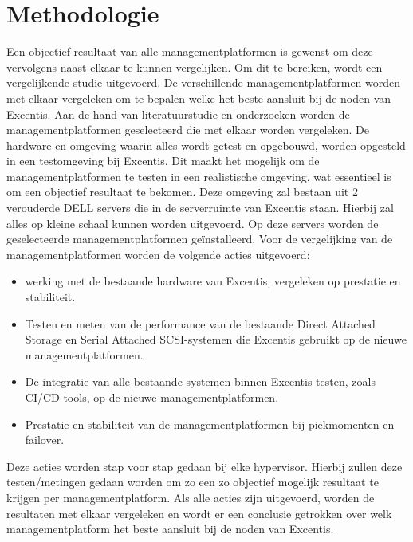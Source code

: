 

\section{Methodologie}%
\label{sec:methodologie}
Een objectief resultaat van alle managementplatformen is gewenst om deze vervolgens naast elkaar te kunnen vergelijken. Om dit te bereiken, wordt een vergelijkende studie uitgevoerd. De verschillende managementplatformen worden met elkaar vergeleken om te bepalen welke het beste aansluit bij de noden van Excentis.
Aan de hand van literatuurstudie en onderzoeken worden de managementplatformen geselecteerd die met elkaar worden vergeleken.
De hardware en omgeving waarin alles wordt getest en opgebouwd, worden opgesteld in een testomgeving bij Excentis. Dit maakt het mogelijk om de managementplatformen te testen in een realistische omgeving, wat essentieel is om een objectief resultaat te bekomen.
Deze omgeving zal bestaan uit 2 verouderde DELL servers die in de serverruimte van Excentis staan. Hierbij zal alles op kleine schaal kunnen worden uitgevoerd.
Op deze servers worden de geselecteerde managementplatformen geïnstalleerd.
Voor de vergelijking van de managementplatformen worden de volgende acties uitgevoerd:
\begin{itemize}
\item werking met de bestaande hardware van Excentis, vergeleken op prestatie en stabiliteit.
\item Testen en meten van de performance van de bestaande Direct Attached Storage en Serial Attached SCSI-systemen die Excentis gebruikt op de nieuwe managementplatformen.
\item De integratie van alle bestaande systemen binnen Excentis testen, zoals CI/CD-tools, op de nieuwe managementplatformen.
\item Prestatie en stabiliteit van de managementplatformen bij piekmomenten en failover.
\end{itemize}
Deze acties worden stap voor stap gedaan bij elke hypervisor. Hierbij zullen deze testen/metingen gedaan worden om zo een zo objectief mogelijk resultaat te krijgen per managementplatform.
Als alle acties zijn uitgevoerd, worden de resultaten met elkaar vergeleken en wordt er een conclusie getrokken over welk managementplatform het beste aansluit bij de noden van Excentis.

